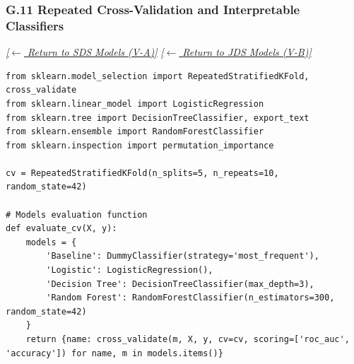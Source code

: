 \documentclass[conference]{IEEEtran}
\begin{document}
\subsubsection*{G.11 Repeated Cross-Validation and Interpretable Classifiers}
\label{lst:sds_models}\label{lst:jds_models}
\textit{\hyperref[sec:sds_models]{[$\leftarrow$ Return to SDS Models (V-A)]}} \quad \textit{\hyperref[sec:jds_models]{[$\leftarrow$ Return to JDS Models (V-B)]}}

\begin{lstlisting}[style=pythonstyle,caption={Repeated stratified 5-fold cross-validation and shallow decision tree rule extraction.},label={lst:models_code}]
from sklearn.model_selection import RepeatedStratifiedKFold, cross_validate
from sklearn.linear_model import LogisticRegression
from sklearn.tree import DecisionTreeClassifier, export_text
from sklearn.ensemble import RandomForestClassifier
from sklearn.inspection import permutation_importance

cv = RepeatedStratifiedKFold(n_splits=5, n_repeats=10, random_state=42)

# Models evaluation function
def evaluate_cv(X, y):
    models = {
        'Baseline': DummyClassifier(strategy='most_frequent'),
        'Logistic': LogisticRegression(),
        'Decision Tree': DecisionTreeClassifier(max_depth=3),
        'Random Forest': RandomForestClassifier(n_estimators=300, random_state=42)
    }
    return {name: cross_validate(m, X, y, cv=cv, scoring=['roc_auc', 'accuracy']) for name, m in models.items()}
\end{lstlisting}
\end{document}
